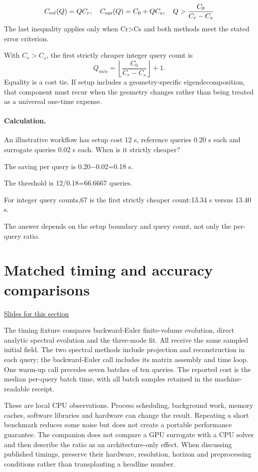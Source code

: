 \documentclass[11pt,letterpaper]{article}
\theoremstyle{definition}\newtheorem{definition}{Definition}\newtheorem{example}{Example}
\numberwithin{equation}{section}
\begin{document}
\[
C_{\rm ref}(Q)=QC_r,\quad C_{\rm sur}(Q)=C_0+QC_s,\quad Q>\frac{C_0}{C_r-C_s}
\]
The last inequality applies only when Cr>Cs and both methods meet the stated error criterion.

With $C_r>C_s$, the first strictly cheaper integer query count is
\[
 Q_{min}=\left\lfloor\frac{C_0}{C_r-C_s}\right\rfloor+1.
\]
Equality is a cost tie. If setup includes a geometry-specific eigendecomposition, that component must recur when the geometry changes rather than being treated as a universal one-time expense.

\paragraph{Calculation.} An illustrative workflow has setup cost 12 s, reference queries 0.20 s each and surrogate queries 0.02 s each. When is it strictly cheaper?

The saving per query is 0.20\ensuremath{-}0.02=0.18 s.

The threshold is 12/0.18=66.6667 queries.

For integer query counts,67 is the first strictly cheaper count:13.34 s versus 13.40 s.

The answer depends on the setup boundary and query count, not only the per-query ratio.
\section{Matched timing and accuracy comparisons}
\hypertarget{note-matched-timing-and-accuracy-comparisons}{}\label{note:matched-timing-and-accuracy-comparisons}
{\small \href{slides.html\#frame=a-cost-error-comparison-panel-1\&step=1}{Slides for this section}}\par
The timing fixture compares backward-Euler finite-volume evolution, direct analytic spectral evolution and the three-mode fit. All receive the same sampled initial field. The two spectral methods include projection and reconstruction in each query; the backward-Euler call includes its matrix assembly and time loop. One warm-up call precedes seven batches of ten queries. The reported cost is the median per-query batch time, with all batch samples retained in the machine-readable receipt.

These are local CPU observations. Process scheduling, background work, memory caches, software libraries and hardware can change the result. Repeating a short benchmark reduces some noise but does not create a portable performance guarantee. The companion does not compare a GPU surrogate with a CPU solver and then describe the ratio as an architecture-only effect. When discussing published timings, preserve their hardware, resolution, horizon and preprocessing conditions rather than transplanting a headline number.
\end{document}
